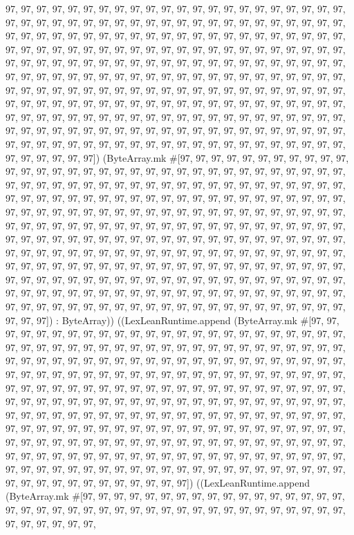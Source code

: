 \documentclass[11pt]{article}
\begin{document}
97, 97, 97, 97, 97, 97, 97, 97, 97, 97, 97, 97, 97, 97, 97, 97, 97, 97, 97, 97, 97, 97, 97, 97, 97, 97, 97, 97, 97, 97, 97, 97, 97, 97, 97, 97, 97, 97, 97, 97, 97, 97, 97, 97, 97, 97, 97, 97, 97, 97, 97, 97, 97, 97, 97, 97, 97, 97, 97, 97, 97, 97, 97, 97, 97, 97, 97, 97, 97, 97, 97, 97, 97, 97, 97, 97, 97, 97, 97, 97, 97, 97, 97, 97, 97, 97, 97, 97, 97, 97, 97, 97, 97, 97, 97, 97, 97, 97, 97, 97, 97, 97, 97, 97, 97, 97, 97, 97, 97, 97, 97, 97, 97, 97, 97, 97, 97, 97, 97, 97, 97, 97, 97, 97, 97, 97, 97, 97, 97, 97, 97, 97, 97, 97, 97, 97, 97, 97, 97, 97, 97, 97, 97, 97, 97, 97, 97, 97, 97, 97, 97, 97, 97, 97, 97, 97, 97, 97, 97, 97, 97, 97, 97, 97, 97, 97, 97, 97, 97, 97, 97, 97, 97, 97, 97, 97, 97, 97, 97, 97, 97, 97, 97, 97, 97, 97, 97, 97, 97, 97, 97, 97, 97, 97, 97, 97, 97, 97, 97, 97, 97, 97, 97, 97, 97, 97, 97, 97, 97, 97, 97, 97, 97, 97, 97, 97, 97, 97, 97, 97, 97, 97, 97, 97, 97, 97, 97, 97, 97, 97, 97, 97, 97, 97, 97, 97, 97, 97, 97, 97, 97, 97, 97, 97, 97, 97, 97, 97]) (ByteArray.mk \#[97, 97, 97, 97, 97, 97, 97, 97, 97, 97, 97, 97, 97, 97, 97, 97, 97, 97, 97, 97, 97, 97, 97, 97, 97, 97, 97, 97, 97, 97, 97, 97, 97, 97, 97, 97, 97, 97, 97, 97, 97, 97, 97, 97, 97, 97, 97, 97, 97, 97, 97, 97, 97, 97, 97, 97, 97, 97, 97, 97, 97, 97, 97, 97, 97, 97, 97, 97, 97, 97, 97, 97, 97, 97, 97, 97, 97, 97, 97, 97, 97, 97, 97, 97, 97, 97, 97, 97, 97, 97, 97, 97, 97, 97, 97, 97, 97, 97, 97, 97, 97, 97, 97, 97, 97, 97, 97, 97, 97, 97, 97, 97, 97, 97, 97, 97, 97, 97, 97, 97, 97, 97, 97, 97, 97, 97, 97, 97, 97, 97, 97, 97, 97, 97, 97, 97, 97, 97, 97, 97, 97, 97, 97, 97, 97, 97, 97, 97, 97, 97, 97, 97, 97, 97, 97, 97, 97, 97, 97, 97, 97, 97, 97, 97, 97, 97, 97, 97, 97, 97, 97, 97, 97, 97, 97, 97, 97, 97, 97, 97, 97, 97, 97, 97, 97, 97, 97, 97, 97, 97, 97, 97, 97, 97, 97, 97, 97, 97, 97, 97, 97, 97, 97, 97, 97, 97, 97, 97, 97, 97, 97, 97, 97, 97, 97, 97, 97, 97, 97, 97, 97, 97, 97, 97, 97, 97, 97, 97, 97, 97, 97, 97, 97, 97, 97, 97, 97, 97, 97, 97, 97, 97, 97, 97, 97, 97, 97, 97, 97, 97, 97, 97, 97, 97, 97, 97]) : ByteArray)) ((LexLeanRuntime.append (ByteArray.mk \#[97, 97, 97, 97, 97, 97, 97, 97, 97, 97, 97, 97, 97, 97, 97, 97, 97, 97, 97, 97, 97, 97, 97, 97, 97, 97, 97, 97, 97, 97, 97, 97, 97, 97, 97, 97, 97, 97, 97, 97, 97, 97, 97, 97, 97, 97, 97, 97, 97, 97, 97, 97, 97, 97, 97, 97, 97, 97, 97, 97, 97, 97, 97, 97, 97, 97, 97, 97, 97, 97, 97, 97, 97, 97, 97, 97, 97, 97, 97, 97, 97, 97, 97, 97, 97, 97, 97, 97, 97, 97, 97, 97, 97, 97, 97, 97, 97, 97, 97, 97, 97, 97, 97, 97, 97, 97, 97, 97, 97, 97, 97, 97, 97, 97, 97, 97, 97, 97, 97, 97, 97, 97, 97, 97, 97, 97, 97, 97, 97, 97, 97, 97, 97, 97, 97, 97, 97, 97, 97, 97, 97, 97, 97, 97, 97, 97, 97, 97, 97, 97, 97, 97, 97, 97, 97, 97, 97, 97, 97, 97, 97, 97, 97, 97, 97, 97, 97, 97, 97, 97, 97, 97, 97, 97, 97, 97, 97, 97, 97, 97, 97, 97, 97, 97, 97, 97, 97, 97, 97, 97, 97, 97, 97, 97, 97, 97, 97, 97, 97, 97, 97, 97, 97, 97, 97, 97, 97, 97, 97, 97, 97, 97, 97, 97, 97, 97, 97, 97, 97, 97, 97, 97, 97, 97, 97, 97, 97, 97, 97, 97, 97, 97, 97, 97, 97, 97, 97, 97, 97, 97, 97, 97, 97, 97, 97, 97, 97, 97, 97, 97, 97, 97, 97, 97, 97, 97]) ((LexLeanRuntime.append (ByteArray.mk \#[97, 97, 97, 97, 97, 97, 97, 97, 97, 97, 97, 97, 97, 97, 97, 97, 97, 97, 97, 97, 97, 97, 97, 97, 97, 97, 97, 97, 97, 97, 97, 97, 97, 97, 97, 97, 97, 97, 97, 97, 97, 97, 97, 97, 97, 
\end{document}
